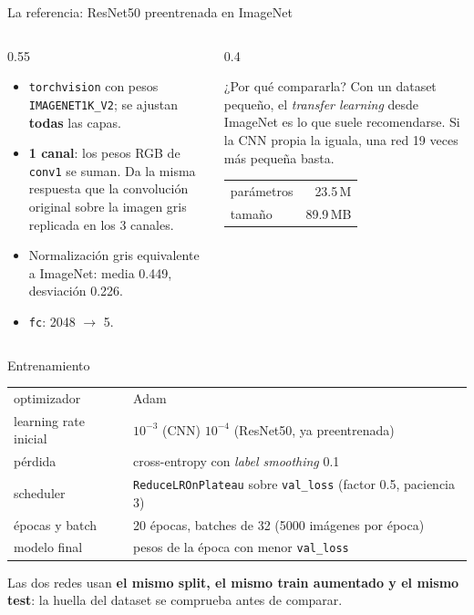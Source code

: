\documentclass[aspectratio=169,11pt]{beamer}
\begin{document}
\begin{frame}{La referencia: ResNet50 preentrenada en ImageNet}
  \begin{columns}[T]
    \begin{column}{0.55\textwidth}
      \begin{itemize}
        \item \texttt{torchvision} con pesos \texttt{IMAGENET1K\_V2}; se ajustan \textbf{todas} las capas.
        \item \textbf{1 canal}: los pesos RGB de \texttt{conv1} se suman. Da la misma respuesta que la convolución original sobre la imagen gris replicada en los 3 canales.
        \item Normalización gris equivalente a ImageNet: media 0.449, desviación 0.226.
        \item \texttt{fc}: 2048 $\to$ 5.
      \end{itemize}
    \end{column}
    \begin{column}{0.4\textwidth}
      \begin{block}{¿Por qué compararla?}
        \small Con un dataset pequeño, el \emph{transfer learning} desde ImageNet es lo que suele recomendarse. Si la CNN propia la iguala, una red 19 veces más pequeña basta.
      \end{block}
      \medskip
      \centering
      \begin{tabular}{lr}
        \toprule
        parámetros & 23.5\,M \\
        tamaño     & 89.9\,MB \\
        \bottomrule
      \end{tabular}
    \end{column}
  \end{columns}
\end{frame}

\begin{frame}{Entrenamiento}
  \centering
  \small
  \renewcommand{\arraystretch}{1.3}
  \begin{tabular}{ll}
    \toprule
    optimizador & Adam \\
    learning rate inicial & $10^{-3}$ (CNN) \quad $10^{-4}$ (ResNet50, ya preentrenada) \\
    pérdida & cross-entropy con \emph{label smoothing} 0.1 \\
    scheduler & \texttt{ReduceLROnPlateau} sobre \texttt{val\_loss} (factor 0.5, paciencia 3) \\
    épocas y batch & 20 épocas, batches de 32 (5000 imágenes por época) \\
    modelo final & pesos de la época con menor \texttt{val\_loss} \\
    \bottomrule
  \end{tabular}

  \bigskip
  \raggedright
  Las dos redes usan \textbf{el mismo split, el mismo train aumentado y el mismo test}: la huella del dataset se comprueba antes de comparar.
\end{frame}
\end{document}
